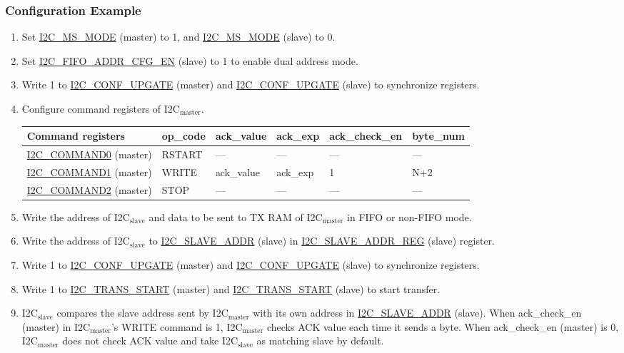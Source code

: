 \documentclass[main\_\_EN.tex]{subfiles}
\begin{document}
\subsubsection{Configuration Example}
\begin{enumerate}
\item Set \hyperref[fielddesc:I2CMSMODE]{I2C\_MS\_MODE} (master) to 1, and \hyperref[fielddesc:I2CMSMODE]{I2C\_MS\_MODE} (slave) to 0.
\item Set \hyperref[fielddesc:I2CFIFOADDRCFGEN]{I2C\_FIFO\_ADDR\_CFG\_EN} (slave) to 1 to enable dual address mode.
\item Write 1 to \hyperref[fielddesc:I2CCONFUPGATE]{I2C\_CONF\_UPGATE} (master) and \hyperref[fielddesc:I2CCONFUPGATE]{I2C\_CONF\_UPGATE} (slave) to synchronize registers.
\item Configure command registers of I2C$_\text{master}$.
\begin{longtable}{ | p{4cm} | p{2cm} | p{2cm} | p{2cm} |p{2cm} | p{2cm} |}
\hline\rowcolor{lightgray}
Command registers& op\_code & ack\_value&ack\_exp&ack\_check\_en&byte\_num  \\ \hline
\hyperref[fielddesc:I2CCOMMAND0]{I2C\_COMMAND0} (master)& RSTART& ---&---&---&---  \\ \hline
\hyperref[fielddesc:I2CCOMMAND1]{I2C\_COMMAND1} (master)& WRITE& ack\_value&ack\_exp&1&N+2  \\ \hline
\hyperref[fielddesc:I2CCOMMAND2]{I2C\_COMMAND2} (master)& STOP& ---&---&---&---  \\ \hline
\end{longtable}
\item Write the address of I2C$_\text{slave}$ and data to be sent to TX RAM of I2C$_\text{master}$ in FIFO or non-FIFO mode.
\item Write the address of I2C$_\text{slave}$ to \hyperref[fielddesc:I2CSLAVEADDR]{I2C\_SLAVE\_ADDR} (slave) in \hyperref[regdesc:I2CSLAVEADDRREG]{I2C\_SLAVE\_ADDR\_REG} (slave) register.
\item Write 1 to \hyperref[fielddesc:I2CCONFUPGATE]{I2C\_CONF\_UPGATE} (master) and \hyperref[fielddesc:I2CCONFUPGATE]{I2C\_CONF\_UPGATE} (slave) to synchronize registers.
\item Write 1 to \hyperref[fielddesc:I2CTRANSSTART]{I2C\_TRANS\_START} (master) and \hyperref[fielddesc:I2CTRANSSTART]{I2C\_TRANS\_START} (slave) to start transfer.
\item I2C$_\text{slave}$ compares the slave address sent by I2C$_\text{master}$ with its own address in \hyperref[fielddesc:I2CSLAVEADDR]{I2C\_SLAVE\_ADDR} (slave). When ack\_check\_en (master) in I2C$_\text{master}$'s WRITE command is 1, I2C$_\text{master}$ checks ACK value each time it sends a byte. When ack\_check\_en (master) is 0, I2C$_\text{master}$ does not check ACK value and take I2C$_\text{slave}$ as matching slave by default.

\end{enumerate}
\end{document}
